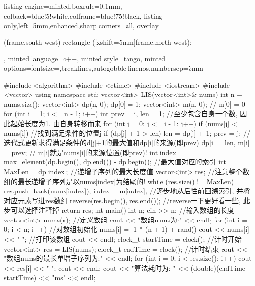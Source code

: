 \documentclass{article}
\begin{document}
\begin{homeworkProblem}
    \newpage
\begin{tcblisting}{listing engine=minted,boxrule=0.1mm,
colback=blue!5!white,colframe=blue!75!black,
listing only,left=5mm,enhanced,sharp corners=all,
overlay={\begin{tcbclipinterior} (frame.south west)
rectangle ([xshift=5mm]frame.north west);\end{tcbclipinterior}},
minted language=c++,
minted style=tango,
minted options={fontsize=\small,breaklines,autogobble,linenos,numbersep=3mm}}
#include <algorithm>
#include <ctime>
#include <iostream>
#include <vector>
using namespace std;
vector<int> LIS(vector<int>& nums) {
    int n = nums.size();
    vector<int> dp(n, 0);
    dp[0] = 1;
    vector<int> m(n, 0); // m[0] = 0
    for (int i = 1; i <= n - 1; i++) {
        int prev = i, len = 1; //至少包含自身一个数, 因此起始长度为1, 由自身转移而来
        for (int j = 0; j <= i - 1; j++) {
            if (nums[j] < nums[i]) { //找到满足条件的位置j
                if (dp[j] + 1 > len) {
                    len = dp[j] + 1;
                    prev = j; //迭代式更新求得满足条件的d[j]+1的最大值和dp[i]的来源(即prev)
                }
            }
        }
        dp[i] = len, m[i] = prev; // m[i]就是nums[i]的来源位置(即prev)!
    }
    int index = max_element(dp.begin(), dp.end()) - dp.begin(); //最大值对应的索引
    int MaxLen = dp[index]; //递增子序列的最大长度值
    vector<int> res; //注意整个数组的最长递增子序列是以nums[index]为结尾的!
    while (res.size() != MaxLen) {
        res.push_back(nums[index]);
        index = m[index]; //逐步地从后往前回溯索引, 并将对应元素写进res数组
    }
    reverse(res.begin(), res.end()); //reverse一下更好看一些, 此步可以选择注释掉
    return res;
}
int main() {
    int n;
    cin >> n;            //输入数组的长度
    vector<int> nums(n); //定义数组
    cout << "数组nums为:" << endl;
    for (int i = 0; i < n; i++) { //对数组初始化
        nums[i] = -1 * (n + 1) +
                  rand() %
        cout << nums[i] << " "; //打印该数组
    }
    cout << endl;
    clock_t startTime = clock(); //计时开始
    vector<int> res = LIS(nums);
    clock_t endTime = clock(); //计时结束
    cout << "数组nums的最长单增子序列为:" << endl;
    for (int i = 0; i < res.size(); i++) {
        cout << res[i] << " ";
    }
    cout << endl;
    cout << "算法耗时为: " << (double)(endTime - startTime) << "ms" << endl;
}
\end{tcblisting}
\end{homeworkProblem}
\end{document}
